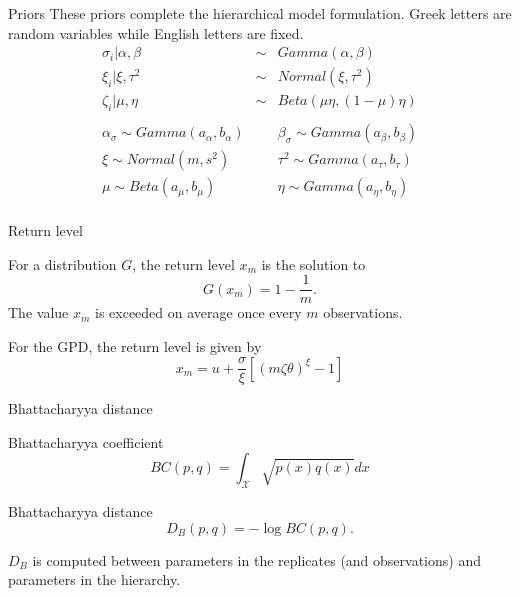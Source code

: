 \documentclass[mathserif, 11pt, t]{beamer}
\begin{document}
\begin{frame}{Priors}
\noindent These priors complete the hierarchical model formulation. Greek letters are random variables while English letters are fixed.
\begin{eqnarray*}
\sigma_i|\alpha, \beta &\sim& Gamma(\alpha, \beta) \\
\xi_i|\xi, \tau^2  &\sim& Normal(\xi, \tau^2) \\
\zeta_i|\mu, \eta &\sim& Beta(\mu\eta, (1-\mu)\eta) \\
 \\
\alpha_\sigma \sim Gamma(a_\alpha, b_\alpha)&  &\beta_\sigma \sim Gamma(a_\beta, b_\beta) \\
\xi \sim Normal(m, s^2)&  &\tau^2 \sim Gamma(a_\tau, b_\tau) \\
\mu \sim Beta(a_\mu, b_\mu)&  &\eta \sim Gamma(a_\eta, b_\eta) \\
\end{eqnarray*}

\end{frame}



\begin{frame}{Return level}

For a distribution $G$, the return level $x_m$ is the solution to
\[ G(x_m) = 1-\frac{1}{m}. \]
The value $x_m$ is exceeded on average once every $m$ observations.
\bigskip

For the GPD, the return level is given by
\[ x_m = u +\frac{\sigma}{\xi}\left[\left(m\zeta\theta\right)^\xi-1\right] \]



\end{frame}




\begin{frame}{Bhattacharyya distance}

Bhattacharyya coefficient
\[ BC(p,q)=\int_\mathcal{X} \sqrt{p(x)q(x)} dx \]

Bhattacharyya distance
\[ D_B(p,q)=-\log BC(p,q). \]

$D_B$ is computed between parameters in the replicates (and observations) and parameters in the hierarchy.

\end{frame}
\end{document}
